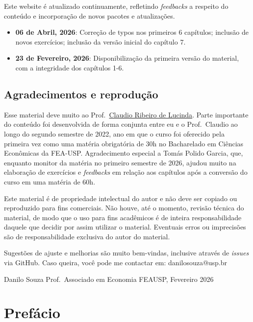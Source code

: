 \documentclass[
  brazilian,
  letterpaper,
  DIV=11,
  numbers=noendperiod]{scrreprt}
\providecommand{\tightlist}{%
  \setlength{\itemsep}{0pt}\setlength{\parskip}{0pt}}
\begin{document}
Este website é atualizado continuamente, refletindo \emph{feedbacks} a
respeito do conteúdo e incorporação de novos pacotes e atualizações.

\begin{itemize}
\tightlist
\item
  \textbf{06 de Abril, 2026}: Correção de typos nos primeiros 6
  capítulos; inclusão de novos exercícios; inclusão da versão inicial do
  capítulo 7.
\item
  \textbf{23 de Fevereiro, 2026}: Disponibilização da primeira versão do
  material, com a integridade dos capítulos 1-6.
\end{itemize}

\section*{Agradecimentos e
reprodução}\label{agradecimentos-e-reproduuxe7uxe3o}


Esse material deve muito ao
Prof.~\href{https://www.claudiolucinda.net/}{Claudio Ribeiro de
Lucinda}. Parte importante do conteúdo foi desenvolvida de forma
conjunta entre eu e o Prof.~Claudio ao longo do segundo semestre de
2022, ano em que o curso foi oferecido pela primeira vez como uma
matéria obrigatória de 30h no Bacharelado em Ciências Econômicas da
FEA-USP. Agradecimento especial a Tomás Polido Garcia, que, enquanto
monitor da matéria no primeiro semestre de 2026, ajudou muito na
elaboração de exercícios e \emph{feedbacks} em relação aos capítulos
após a conversão do curso em uma matéria de 60h.

Este material é de propriedade intelectual do autor e não deve ser
copiado ou reproduzido para fins comerciais. Não houve, até o momento,
revisão técnica do material, de modo que o uso para fins acadêmicos é de
inteira responsabilidade daquele que decidir por assim utilizar o
material. Eventuais erros ou imprecisões são de responsabilidade
exclusiva do autor do material.

Sugestões de ajuste e melhorias são muito bem-vindas, inclusive através
de \emph{issues} via GitHub. Caso queira, você pode me contactar em:
danilosouza@usp.br

Danilo Souza Prof.~Associado em Economia FEAUSP, Fevereiro 2026


\chapter*{Prefácio}\label{sec-prefacio}
\end{document}
